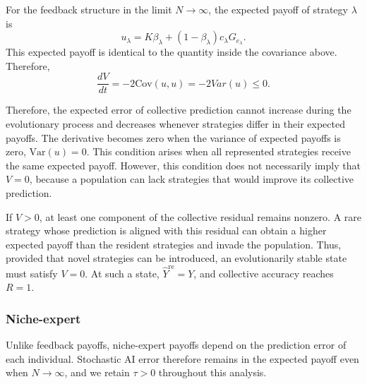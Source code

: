 \documentclass[12pt]{article}
\begin{document}
For the feedback structure in the limit $N\to\infty$, the expected payoff of strategy $\lambda$ is
\begin{equation}
u_\lambda = K\beta_\lambda+(1-\beta_\lambda)c_\lambda G_{e_\lambda}.
\end{equation}
This expected payoff is identical to the quantity inside the covariance above. 
Therefore,
\begin{equation}
\frac{dV}{dt} = -2\mathrm{Cov}(u,u) = -2Var(u) \leq 0.
\end{equation}

Therefore, the expected error of collective prediction cannot increase during the evolutionary process and decreases whenever strategies differ in their expected payoffs. 
The derivative becomes zero when the variance of expected payoffs is zero, $\mathrm{Var}(u)=0$.
This condition arises when all represented strategies receive the same expected payoff.
However, this condition does not necessarily imply that $V=0$, because a population can lack strategies that would improve its collective prediction.

If $V>0$, at least one component of the collective residual remains nonzero. 
A rare strategy whose prediction is aligned with this residual can obtain a higher expected payoff than the resident strategies and invade the population. 
Thus, provided that novel strategies can be introduced, an evolutionarily stable state must satisfy $V=0$. 
At such a state, $\hat{Y}^{\mathrm{re}}=Y$, and collective accuracy reaches $R=1$.

\subsubsection*{Niche-expert}

Unlike feedback payoffs, niche-expert payoffs depend on the prediction error of each individual. 
Stochastic AI error therefore remains in the expected payoff even when $N\to\infty$, and we retain $\tau>0$ throughout this analysis.
\end{document}
